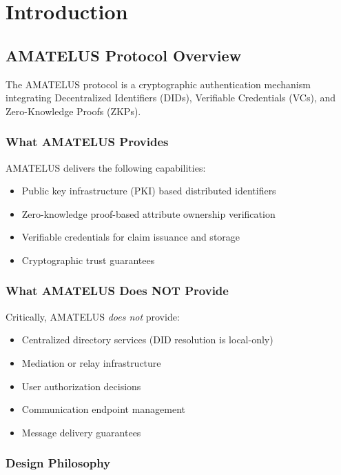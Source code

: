 
\chapter{Introduction}

\section{AMATELUS Protocol Overview}

The AMATELUS protocol is a cryptographic authentication mechanism integrating Decentralized Identifiers (DIDs), Verifiable Credentials (VCs), and Zero-Knowledge Proofs (ZKPs).

\subsection{What AMATELUS Provides}

AMATELUS delivers the following capabilities:
\begin{itemize}
  \item Public key infrastructure (PKI) based distributed identifiers
  \item Zero-knowledge proof-based attribute ownership verification
  \item Verifiable credentials for claim issuance and storage
  \item Cryptographic trust guarantees
\end{itemize}

\subsection{What AMATELUS Does NOT Provide}

Critically, AMATELUS \emph{does not} provide:
\begin{itemize}
  \item Centralized directory services (DID resolution is local-only)
  \item Mediation or relay infrastructure
  \item User authorization decisions
  \item Communication endpoint management
  \item Message delivery guarantees
\end{itemize}

\subsection{Design Philosophy}

